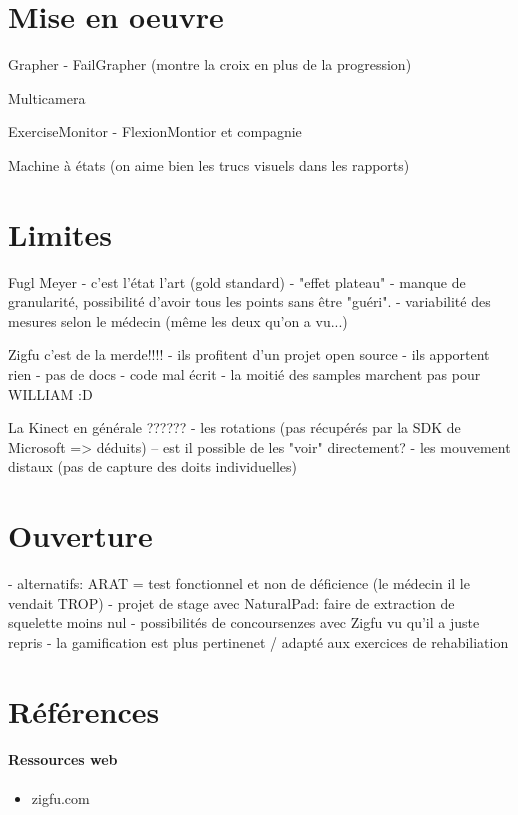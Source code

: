 \documentclass[french,12pt]{report}
\begin{document}
		\section{Mise en oeuvre} 	%

		Grapher
		- FailGrapher (montre la croix en plus de la progression)
		
		Multicamera
		
		ExerciseMonitor
		- FlexionMontior et compagnie
		
		Machine à états (on aime bien les trucs visuels dans les rapports)
		
		\section{Limites}%
		
		Fugl Meyer
		- c'est l'état l'art (gold standard)
		- "effet plateau" - manque de granularité, possibilité d'avoir tous les points sans être "guéri".
		- variabilité des mesures selon le médecin (même les deux qu'on a vu...)	
		
		Zigfu c'est de la merde!!!!
		- ils profitent d'un projet open source
		- ils apportent rien
		- pas de docs
		- code mal écrit
		- la moitié des samples marchent pas pour WILLIAM :D
		
		La Kinect en générale ??????
		- les rotations (pas récupérés par la SDK de Microsoft => déduits)
		  -- est il possible de les "voir" directement?
		- les mouvement distaux (pas de capture des doits individuelles)
		
		\section{Ouverture}	%
		
		- alternatifs: ARAT = test fonctionnel et non de déficience (le médecin il le vendait TROP)
		- projet de stage avec NaturalPad: faire de extraction de squelette moins nul
		- possibilités de concoursenzes avec Zigfu vu qu'il a juste repris 
		- la gamification est plus pertinenet / adapté aux exercices de rehabiliation 
		
		\section{Références}
			\paragraph{Ressources web}
				\begin{itemize}
					\item zigfu.com
				\end{itemize}
\end{document}
